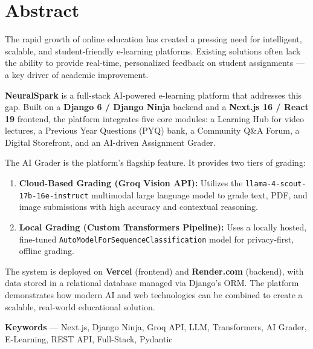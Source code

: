 \documentclass[12pt,a4paper]{report}
\begin{document}
\chapter*{Abstract}

The rapid growth of online education has created a pressing need for intelligent, scalable, and
student-friendly e-learning platforms. Existing solutions often lack the ability to provide
real-time, personalized feedback on student assignments — a key driver of academic improvement.

\textbf{NeuralSpark} is a full-stack AI-powered e-learning platform that addresses this gap. Built on
a \textbf{Django 6 / Django Ninja} backend and a \textbf{Next.js 16 / React 19} frontend, the platform
integrates five core modules: a Learning Hub for video lectures, a Previous Year Questions (PYQ)
bank, a Community Q\&A Forum, a Digital Storefront, and an AI-driven Assignment Grader.

The AI Grader is the platform's flagship feature. It provides two tiers of grading:
\begin{enumerate}
    \item \textbf{Cloud-Based Grading (Groq Vision API):} Utilizes the \texttt{llama-4-scout-17b-16e-instruct} multimodal large language model to grade text, PDF, and image submissions with high accuracy and contextual reasoning.
    \item \textbf{Local Grading (Custom Transformers Pipeline):} Uses a locally hosted, fine-tuned \texttt{AutoModelForSequenceClassification} model for privacy-first, offline grading.
\end{enumerate}

The system is deployed on \textbf{Vercel} (frontend) and \textbf{Render.com} (backend), with data
stored in a relational database managed via Django's ORM. The platform demonstrates how
modern AI and web technologies can be combined to create a scalable, real-world educational
solution.

\vspace{0.5cm}
\noindent\textbf{Keywords} --- Next.js, Django Ninja, Groq API, LLM, Transformers, AI Grader, E-Learning, REST API, Full-Stack, Pydantic

\tableofcontents
\listoftables
\listoffigures

\setcounter{page}{1}
\end{document}
